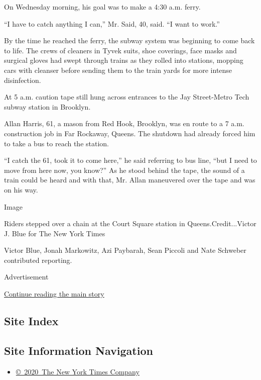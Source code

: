 On Wednesday morning, his goal was to make a 4:30 a.m. ferry.

``I have to catch anything I can,'' Mr. Said, 40, said. ``I want to
work.''

By the time he reached the ferry, the subway system was beginning to
come back to life. The crews of cleaners in Tyvek suits, shoe coverings,
face masks and surgical gloves had swept through trains as they rolled
into stations, mopping cars with cleanser before sending them to the
train yards for more intense disinfection.

At 5 a.m. caution tape still hung across entrances to the Jay
Street-Metro Tech subway station in Brooklyn.

Allan Harris, 61, a mason from Red Hook, Brooklyn, was en route to a 7
a.m. construction job in Far Rockaway, Queens. The shutdown had already
forced him to take a bus to reach the station.

``I catch the 61, took it to come here,'' he said referring to bus line,
``but I need to move from here now, you know?'' As he stood behind the
tape, the sound of a train could be heard and with that, Mr. Allan
maneuvered over the tape and was on his way.

Image

Riders stepped over a chain at the Court Square station in
Queens.Credit...Victor J. Blue for The New York Times

Victor Blue, Jonah Markowitz, Azi Paybarah, Sean Piccoli and Nate
Schweber contributed reporting.

Advertisement

\protect\hyperlink{after-bottom}{Continue reading the main story}

\hypertarget{site-index}{%
\subsection{Site Index}\label{site-index}}

\hypertarget{site-information-navigation}{%
\subsection{Site Information
Navigation}\label{site-information-navigation}}

\begin{itemize}
\tightlist
\item
  \href{https://help.nytimes3xbfgragh.onion/hc/en-us/articles/115014792127-Copyright-notice}{©~2020~The
  New York Times Company}
\end{itemize}

